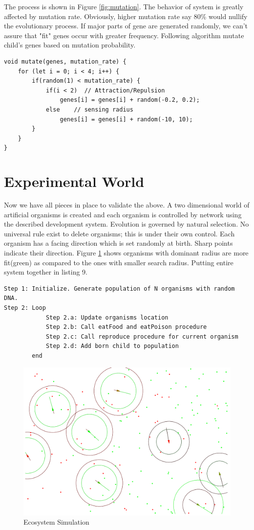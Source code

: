 \documentclass[conference]{IEEEtran}
\begin{document}
The process is shown in Figure \ref{fig:mutation}. The behavior of system is greatly affected by mutation rate. Obviously, higher mutation rate say 80\% would nullify the evolutionary process. If major parts of gene are generated randomly, we can't assure that "fit" genes occur with greater frequency. Following algorithm mutate child's genes based on mutation probability.
\begin{lstlisting}[caption=Mutating genes array based on mutation rate]
void mutate(genes, mutation_rate) {
	for (let i = 0; i < 4; i++) {
		if(random(1) < mutation_rate) {
			if(i < 2)  // Attraction/Repulsion
				genes[i] = genes[i] + random(-0.2, 0.2);
			else 	// sensing radius
				genes[i] = genes[i] + random(-10, 10);
		}
	}
}
\end{lstlisting}
\section{Experimental World}
Now we have all pieces in place to validate the above. A two dimensional world of artificial organisms is created and each organism is controlled by network using the described development system. Evolution is governed by natural selection. No universal rule exist to delete organisms; this is under their own control. Each organism has a facing direction which is set randomly at birth. Sharp points indicate their direction. Figure \ref{fig:ecosystem} shows organisms with dominant radius are more fit(green) as compared to the ones with smaller search radius. Putting entire system together in listing 9.
\begin{lstlisting}[caption=Genetic Algorithm: Evolving ecosystem]
Step 1: Initialize. Generate population of N organisms with random DNA.
Step 2: Loop
			Step 2.a: Update organisms location
			Step 2.b: Call eatFood and eatPoison procedure
			Step 2.c: Call reproduce procedure for current organism
			Step 2.d: Add born child to population
		end
\end{lstlisting}
\begin{figure}
	\includegraphics[scale=0.329]{ecosystem.png}
	\caption{Ecosystem Simulation}
	\label{fig:ecosystem}
\end{figure}
\end{document}
